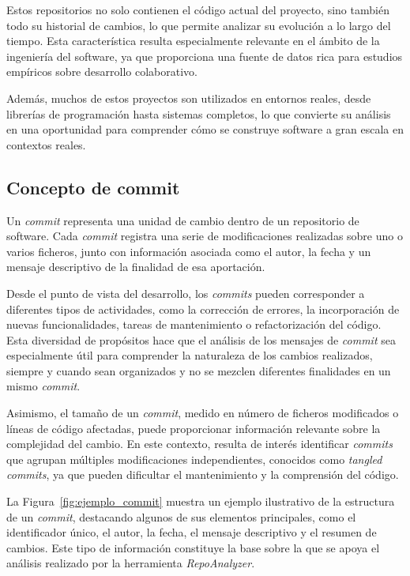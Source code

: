 \documentclass[a4paper, 12pt]{book}
\begin{document}
Estos repositorios no solo contienen el código actual del proyecto, sino también todo su historial de cambios, lo que permite analizar su evolución a lo largo del tiempo. Esta característica resulta especialmente relevante en el ámbito de la ingeniería del software, ya que proporciona una fuente de datos rica para estudios empíricos sobre desarrollo colaborativo.

Además, muchos de estos proyectos son utilizados en entornos reales, desde librerías de programación hasta sistemas completos, lo que convierte su análisis en una oportunidad para comprender cómo se construye software a gran escala en contextos reales.

\subsection{Concepto de commit}
\label{subsec:commit}

Un \emph{commit} representa una unidad de cambio dentro de un repositorio de software. Cada \emph{commit} registra una serie de modificaciones realizadas sobre uno o varios ficheros, junto con información asociada como el autor, la fecha y un mensaje descriptivo de la finalidad de esa aportación.

Desde el punto de vista del desarrollo, los \emph{commits} pueden corresponder a diferentes tipos de actividades, como la corrección de errores, la incorporación de nuevas funcionalidades, tareas de mantenimiento o refactorización del código. Esta diversidad de propósitos hace que el análisis de los mensajes de \emph{commit} sea especialmente útil para comprender la naturaleza de los cambios realizados, siempre y cuando sean organizados y no se mezclen diferentes finalidades en un mismo \emph{commit}.

Asimismo, el tamaño de un \emph{commit}, medido en número de ficheros modificados o líneas de código afectadas, puede proporcionar información relevante sobre la complejidad del cambio. En este contexto, resulta de interés identificar \emph{commits} que agrupan múltiples modificaciones independientes, conocidos como \emph{tangled commits}, ya que pueden dificultar el mantenimiento y la comprensión del código.

La Figura~\ref{fig:ejemplo_commit} muestra un ejemplo ilustrativo de la estructura de un \emph{commit}, destacando algunos de sus elementos principales, como el identificador único, el autor, la fecha, el mensaje descriptivo y el resumen de cambios. Este tipo de información constituye la base sobre la que se apoya el análisis realizado por la herramienta \emph{RepoAnalyzer}.
\end{document}
